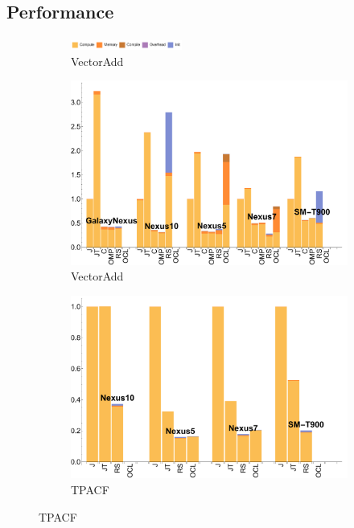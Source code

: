 \subsection{Performance}


\begin{figure}[ht]

  \begin{subfigure}[b]{\textwidth}
          \centering
          \includegraphics[width=0.4\textwidth]{data/legend.pdf}
          \caption{VectorAdd}\label{fig:vectoradd}
  \end{subfigure}

  \begin{subfigure}[b]{0.5\textwidth}
      \centering
      \includegraphics[width=\textwidth]{data/VectorAdd_time.pdf}
      \caption{VectorAdd}\label{fig:vectoradd}
  \end{subfigure}
  \begin{subfigure}[b]{0.5\textwidth}
      \centering
      \includegraphics[width=\textwidth]{data/Tpacf_time.pdf}
      \caption{TPACF}
      \label{fig:TPACF}
  \end{subfigure}


\end{figure}
